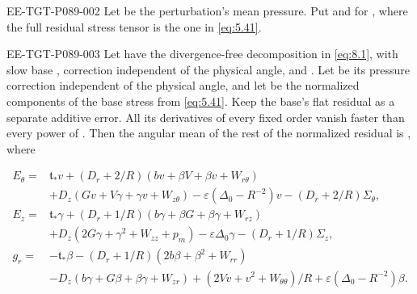 \begin{EESegment}{EE-TGT-P089-002}
Let  be the perturbation's mean pressure. Put
 and
 for
, where the full residual stress tensor is the one in
\eqref{eq:5.41}.
\end{EESegment}

\begin{proposition}\label{prop:8.1}
\begin{EESegment}{EE-TGT-P089-003}
Let  have the divergence-free decomposition in \eqref{eq:8.1}, with slow
base , correction
 independent of the physical angle, and
. Let  be its pressure
correction independent of the physical angle, and let
 be the normalized components of
the base stress from \eqref{eq:5.41}. Keep the base's flat residual as a separate additive error. All
its derivatives of every fixed order vanish faster than every power of
. Then the angular mean of the rest of the normalized residual is
, where
\end{EESegment}
\begin{equation}
\begin{aligned}
E_\theta={}&\mathfrak t_*v+(D_r+2/R)(bv+\beta V+\beta v+W_{r\theta})\\
 &+D_z(Gv+V\gamma+\gamma v+W_{z\theta})
   -\varepsilon(\Delta_0-R^{-2})v-(D_r+2/R)\Sigma_\theta,\\
E_z={}&\mathfrak t_*\gamma+(D_r+1/R)(b\gamma+\beta G+\beta\gamma+W_{rz})\\
 &+D_z(2G\gamma+\gamma^2+W_{zz}+p_m)-\varepsilon\Delta_0\gamma-(D_r+1/R)\Sigma_z,\\
g_r={}&-\mathfrak t_*\beta-(D_r+1/R)(2b\beta+\beta^2+W_{rr})\\
 &-D_z(b\gamma+G\beta+\beta\gamma+W_{zr})
   +(2Vv+v^2+W_{\theta\theta})/R+\varepsilon(\Delta_0-R^{-2})\beta.
\end{aligned}
\tag{8.3}\label{eq:8.3}
\end{equation}
\end{proposition}

